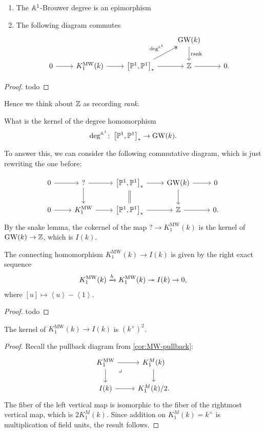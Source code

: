 \documentclass[11pt,openany]{book}
\providecommand{\MW}{\mathrm{MW}}
\begin{document}
\begin{proposition} $\ $
\begin{enumerate}
    \item The $\mathbb{A}^1$-Brouwer degree is an epimorphism
    \item The following diagram commutes
    \[ \begin{tikzcd}
     & & & \GW(k)\dar["\text{rank}" right]\\
   0\rar &  K^\MW_1(k)\rar & { \left[ \P^1,\P^1 \right]_\ast}\rar\ar[ur,two heads,"\deg^{\A^1}" above left] & \Z\rar & 0.
\end{tikzcd} \]
\end{enumerate}
\end{proposition}
\begin{proof} todo
\end{proof}

Hence we think about $\mathbb{Z}$ as recording \textit{rank}.

\begin{question} What is the kernel of the degree homomorphism
\begin{align*}
    \deg^{\mathbb{A}^1} \colon \left[ \mathbb{P}^1,\mathbb{P}^1 \right]_\ast \to \mathrm{GW}(k).
\end{align*}
\end{question}
To answer this, we can consider the following commutative diagram, which is just rewriting the one before:

\[ \begin{tikzcd}
    0\rar & ?\rar\dar & { \left[ \P^1,\P^1 \right]_\ast}\rar\dar[equal] & \GW(k)\rar\dar & 0\\
    0\rar & K^\MW_1\rar & { \left[ \P^1,\P^1 \right]_\ast}\rar & \Z\rar & 0.
\end{tikzcd} \]
By the snake lemma, the cokernel of the map $? \to K_1^\MW(k)$ is the kernel of $\mathrm{GW}(k) \to \mathbb{Z}$, which is $I(k)$.

\begin{proposition} The connecting homomorphism $K_1^\MW(k) \to I(k)$ is given by the right exact sequence
\begin{align*}
    K_1^\MW(k) \xto{h} K_1^\MW(k) \tto I(k) \to 0,
\end{align*}
where $[u] \mapsto \left\langle u \right\rangle - \left\langle 1 \right\rangle$.
\end{proposition}
\begin{proof} todo
\end{proof}

\begin{proposition} The kernel of $K_1^\MW(k) \to I(k)$ is $(k^\times)^2$.
\end{proposition}
\begin{proof} Recall the pullback diagram from \autoref{cor:MW-pullback}:
\[ \begin{tikzcd}
    K^\MW_1\rar\dar\pb & K^M_1(k)\dar\\
    I(k)\rar & K^M_1(k)/2.
\end{tikzcd} \]
The fiber of the left vertical map is isomorphic to the fiber of the rightmost vertical map, which is $2K_1^M(k)$. Since addition on $K_1^M(k) = k^\times$ is multiplication of field units, the result follows.
\end{proof}
\end{document}
